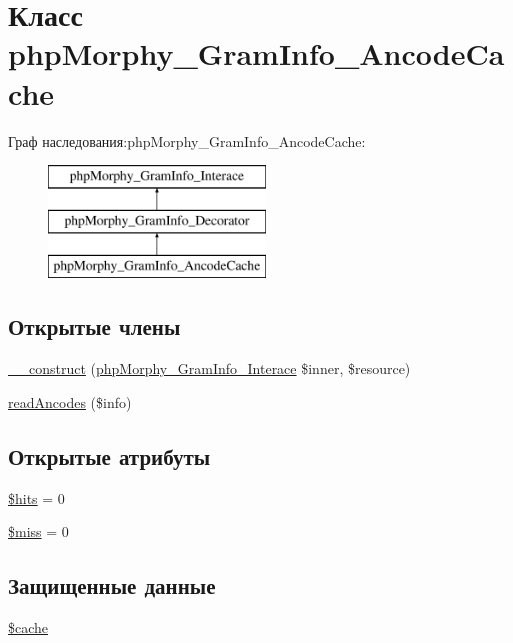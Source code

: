 \hypertarget{classphpMorphy__GramInfo__AncodeCache}{
\section{Класс phpMorphy\_\-GramInfo\_\-AncodeCache}
\label{classphpMorphy__GramInfo__AncodeCache}
}
Граф наследования:phpMorphy\_\-GramInfo\_\-AncodeCache:\begin{figure}[H]
\begin{center}
\leavevmode
\includegraphics[height=3.000000cm]{classphpMorphy__GramInfo__AncodeCache}
\end{center}
\end{figure}
\subsection*{Открытые члены}
\begin{DoxyCompactItemize}
\item 
\hyperlink{classphpMorphy__GramInfo__AncodeCache_a60c617c068c94433dfc7d3541cc41771}{\_\-\_\-construct} (\hyperlink{interfacephpMorphy__GramInfo__Interace}{phpMorphy\_\-GramInfo\_\-Interace} \$inner, \$resource)
\item 
\hyperlink{classphpMorphy__GramInfo__AncodeCache_a37a109f9cd2cc8cb87f96ec82a4278cd}{readAncodes} (\$info)
\end{DoxyCompactItemize}
\subsection*{Открытые атрибуты}
\begin{DoxyCompactItemize}
\item 
\hyperlink{classphpMorphy__GramInfo__AncodeCache_a3aaf71ee909e5038c772bd33060b8990}{\$hits} = 0
\item 
\hyperlink{classphpMorphy__GramInfo__AncodeCache_abb4d480c8601212c7ff2ecfecf877e35}{\$miss} = 0
\end{DoxyCompactItemize}
\subsection*{Защищенные данные}
\begin{DoxyCompactItemize}
\item 
\hyperlink{classphpMorphy__GramInfo__AncodeCache_a20b69bfdd989661cbc20d088f6a51db1}{\$cache}
\end{DoxyCompactItemize}



